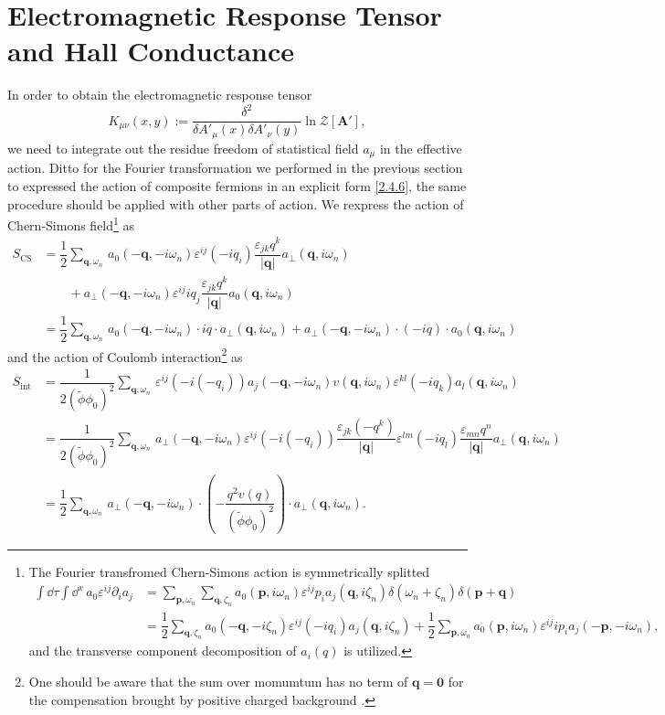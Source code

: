 \documentclass[bachelor,english,numbers]{ustcthesis}
\begin{document}
	\section{Electromagnetic Response Tensor and Hall Conductance}
		\indent\par In order to obtain the electromagnetic response tensor 
		\begin{equation*}
			K_{\mu\nu}(x,y):=\frac{\delta^2}{\delta A'_\mu(x)\delta A'_\nu(y)}\ln\mathcal{Z}[\bm{A'}],
		\end{equation*}
		we need to integrate out the residue freedom of statistical field $a_\mu$ in the effective action. Ditto for the Fourier transformation we performed in the previous section to expressed the action of composite fermions in an explicit form \eqref{2.4.6}, the same procedure should be applied with other parts of action. We rexpress the action of Chern-Simons field\footnote{The Fourier transfromed Chern-Simons action is symmetrically splitted
		\begin{align*}
			\int\dd\tau\int\dd^x\,a_0 \varepsilon^{ij}\partial_i a_j&=\sum_{\bm{p},\omega_n}\sum_{\bm{q},\zeta_n}a_0(\bm{p},i\omega_n)\varepsilon^{ij}p_i a_j(\bm{q},i\zeta_n)\delta(\omega_n+\zeta_n)\delta(\bm{p}+\bm{q})\\
			&=\dfrac{1}{2}\sum_{\bm{q},\zeta_n}a_0(-\bm{q},-i\zeta_n)\varepsilon^{ij}(-iq_i)a_j(\bm{q},i\zeta_n)+\dfrac{1}{2}\sum_{\bm{p},\omega_n}a_0(\bm{p},i\omega_n)\varepsilon^{ij}ip_ia_j(-\bm{p},-i\omega_n),
		\end{align*}
		and the transverse component decomposition of $a_i(q)$ is utilized.} as
		\begin{align}
			S_{\text{CS}}&=\dfrac{1}{2}\sum_{\bm{q},\omega_n}\,a_0(-\bm{q},-i\omega_n)\varepsilon^{ij}(-iq_i)\dfrac{\varepsilon_{jk}q^k}{|\bm{q}|}a_{\perp}(\bm{q},i\omega_n)\nonumber\\
			&\qquad+a_\perp(-\bm{q},-i\omega_n)\varepsilon^{ij}iq_j\dfrac{\varepsilon_{jk}q^k}{|\bm{q}|}a_0(\bm{q},i\omega_n)\nonumber\\
			&=\dfrac{1}{2}\sum_{\bm{q},\omega_n}\,a_0(-\bm{q},-i\omega_n)\cdot iq\cdot a_{\perp}(\bm{q},i\omega_n)+a_{\perp}(-\bm{q},-i\omega_n)\cdot(-iq)\cdot a_0(\bm{q},i\omega_n)\label{2.5.1}
		\end{align}
		and the action of Coulomb interaction\footnote{One should be aware that the sum over momumtum has no term of $\bm{q}=\bm{0}$ for the compensation brought by positive charged background \cite{mahan2013many}.} as
		\begin{align}	
			S_{\text{int}}&=\dfrac{1}{2(\widetilde{\phi}\phi_0)^2 }\sum_{\bm{q},\omega_n}\,\varepsilon^{ij}(-i(-q_i)) a_j(-\bm{q},-i\omega_n)v(\bm{q},i\omega_n)\varepsilon^{kl} (-iq_k) a_l(\bm{q},i\omega_n)\nonumber\\
			&=\dfrac{1}{2(\widetilde{\phi}\phi_0)^2 }\sum_{\bm{q},\omega_n}\,a_{\perp}(-\bm{q},-i\omega_n)\varepsilon^{ij}(-i(-q_i))\dfrac{\varepsilon_{jk}(-q^k)}{|\bm{q}|}\varepsilon^{lm}(-iq_l)\dfrac{\varepsilon_{mn}q^n}{|\bm{q}|}a_{\perp}(\bm{q},i\omega_n)\nonumber\\
			&=\dfrac{1}{2}\sum_{\bm{q},\omega_n}\,a_{\perp}(-\bm{q},-i\omega_n)\cdot\left(-\dfrac{q^2v(q)}{(\widetilde{\phi}\phi_0)^2}\right)\cdot a_{\perp}(\bm{q},i\omega_n).\label{2.5.2}
		\end{align}
\end{document}
